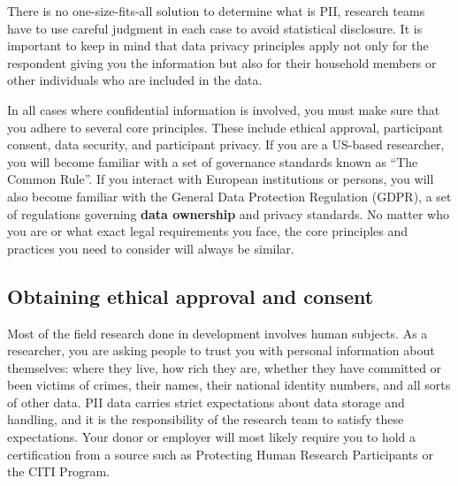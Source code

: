 There is no one-size-fits-all solution to determine what is PII,
research teams have to use careful judgment in each case to avoid statistical disclosure.
It is important to keep in mind that data privacy principles apply
not only for the respondent giving you the information
but also for their household members or other individuals who are included in the data.

In all cases where confidential information is involved,
you must make sure that you adhere to several core principles.
These include ethical approval, participant consent,
data security, and participant privacy.
If you are a US-based researcher, you will become familiar
with a set of governance standards known as ``The Common Rule''.
If you interact with European institutions or persons,
you will also become familiar with the General Data Protection Regulation (GDPR),
a set of regulations governing \textbf{data ownership} and privacy standards.
No matter who you are or what exact legal requirements you face,
the core principles and practices you need to consider will always be similar.

\subsection{Obtaining ethical approval and consent}

Most of the field research done in development involves human subjects.
As a researcher, you are asking people to trust you with personal information about themselves:
where they live, how rich they are, whether they have committed or been victims of crimes,
their names, their national identity numbers, and all sorts of other data.
PII data carries strict expectations about data storage and handling,
and it is the responsibility of the research team to satisfy these expectations.
Your donor or employer will most likely require you to hold a certification from a source
such as Protecting Human Research Participants
or the CITI Program.

